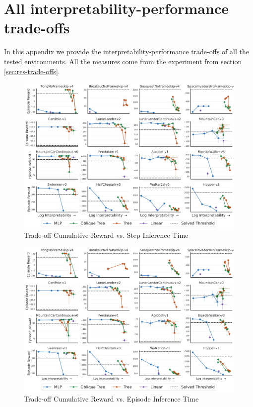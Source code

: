 \section{All interpretability-performance trade-offs}\label{sec:trade-offs-full}
In this appendix we provide the interpretability-performance trade-offs of all the tested environments. All the measures come from the experiment from section \ref{sec:res-trade-offs}.

\begin{figure}
    \centering
    \includegraphics[width=1\linewidth]{images/images_part3/trade_off_step_times.pdf}
    \caption{Trade-off Cumulative Reward vs. Step Inference Time}
    \label{fig:trade-off}
\end{figure}

\begin{figure}[ht]
    \centering
    \includegraphics[width=0.95\linewidth]{images/images_part3/trade_off.pdf}
    \caption{Trade-off Cumulative Reward vs. Episode Inference Time}
    \label{fig:trade-off-episode}
\end{figure}

